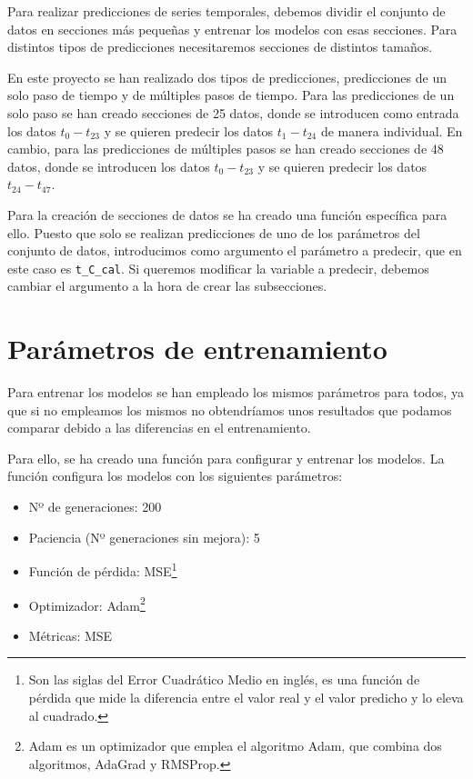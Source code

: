 Para realizar predicciones de series temporales, debemos dividir el conjunto de datos en secciones más pequeñas y entrenar los modelos con esas secciones. Para distintos tipos de predicciones necesitaremos secciones de distintos tamaños.

\par

En este proyecto se han realizado dos tipos de predicciones, predicciones de un solo paso de tiempo y de múltiples pasos de tiempo. Para las predicciones de un solo paso se han creado secciones de 25 datos, donde se introducen como entrada los datos $t_0-t_{23}$ y se quieren predecir los datos $t_1-t_{24}$ de manera individual. En cambio, para las predicciones de múltiples pasos se han creado secciones de 48 datos, donde se introducen los datos $t_0-t_{23}$ y se quieren predecir los datos $t_{24}-t_{47}$.

\par

Para la creación de secciones de datos se ha creado una función específica para ello. Puesto que solo se realizan predicciones de uno de los parámetros del conjunto de datos, introducimos como argumento el parámetro a predecir, que en este caso es \texttt{t\_C\_cal}. Si queremos modificar la variable a predecir, debemos cambiar el argumento a la hora de crear las subsecciones.

\section{Parámetros de entrenamiento}

Para entrenar los modelos se han empleado los mismos parámetros para todos, ya que si no empleamos los mismos no obtendríamos unos resultados que podamos comparar debido a las diferencias en el entrenamiento.

\par

Para ello, se ha creado una función para configurar y entrenar los modelos. La función configura los modelos con los siguientes parámetros:

\begin{itemize}
    \item Nº de generaciones: 200
    \item Paciencia (Nº generaciones sin mejora): 5
    \item Función de pérdida: MSE\footnote{{\label{noteMSE}}Son las siglas del Error Cuadrático Medio en inglés, es una función de pérdida que mide la diferencia entre el valor real y el valor predicho y lo eleva al cuadrado.}
    \item Optimizador: Adam\footnote{Adam\cite{adam} es un optimizador que emplea el algoritmo Adam, que combina dos algoritmos, AdaGrad y RMSProp.}
    \item Métricas: MSE
\end{itemize}

